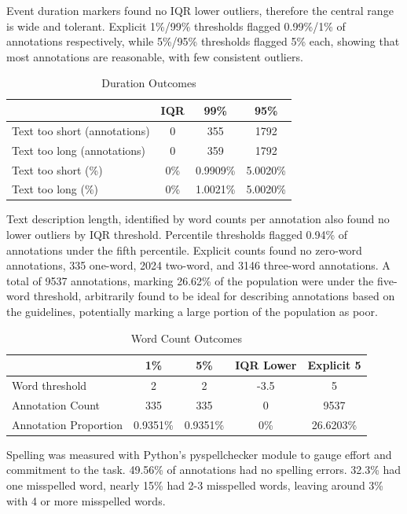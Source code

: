 \documentclass{article}
\begin{document}
Event duration markers found no IQR lower outliers, therefore the central range is wide and tolerant. Explicit 1\%/99\% thresholds flagged 0.99\%/1\% of annotations respectively, while 5\%/95\% thresholds flagged 5\% each, showing that most annotations are reasonable, with few consistent outliers.

\begin{table}[ht]
  \caption{Duration Outcomes}
  \label{tab:duration_outcomes}
  \centering
  \begin{tabular}{lccc}
    \toprule
    & IQR & 99\% & 95\% \\
    \midrule
    Text too short (annotations) & 0 & 355 & 1792 \\
    Text too long (annotations) & 0 & 359 & 1792 \\
    Text too short (\%) & 0\% & 0.9909\% & 5.0020\% \\
    Text too long (\%) & 0\% & 1.0021\% & 5.0020\% \\
    \bottomrule
  \end{tabular}
\end{table}

Text description length, identified by word counts per annotation also found no lower outliers by IQR threshold. Percentile thresholds flagged 0.94\% of annotations under the fifth percentile. Explicit counts found no zero-word annotations, 335 one-word, 2024 two-word, and 3146 three-word annotations. A total of 9537 annotations, marking 26.62\% of the population were under the five-word threshold, arbitrarily found to be ideal for describing annotations based on the guidelines, potentially marking a large portion of the population as poor.

\begin{table}[ht]
  \caption{Word Count Outcomes}
  \label{tab:word_outcomes}
  \centering
  \begin{tabular}{lcccc}
    \toprule
    & 1\% & 5\% & IQR Lower & Explicit 5 \\
    \midrule
    Word threshold & 2 & 2 & -3.5 & 5 \\
    Annotation Count & 335 & 335 & 0 & 9537 \\
    Annotation Proportion & 0.9351\% & 0.9351\% & 0\% & 26.6203\% \\
    \bottomrule
  \end{tabular}
\end{table}

Spelling was measured with Python's pyspellchecker module to gauge effort and commitment to the task. 49.56\% of annotations had no spelling errors. 32.3\% had one misspelled word, nearly 15\% had 2-3 misspelled words, leaving around 3\% with 4 or more misspelled words.
\end{document}
